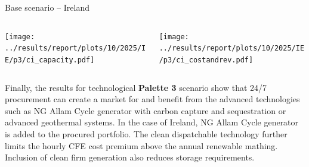 \begin{frame}{Base scenario -- Ireland}

  {\footnotesize

  \begin{columns}
  \begin{column}{7cm}
  \centering
  \texttt{[image: ../results/report/plots/10/2025/IE/p3/ci\_capacity.pdf]}
  \end{column}

  \begin{column}{8cm}
  \centering
  \texttt{[image: ../results/report/plots/10/2025/IE/p3/ci\_costandrev.pdf]}
  \end{column}

  \end{columns}

  \begin{columns}
  \begin{column}{15cm}
  Finally, the results for technological {\bf Palette 3} scenario show that 24/7 procurement
  can create a market for and benefit from the advanced technologies such as 
  NG Allam Cycle generator with carbon capture and sequestration or 
  advanced geothermal systems. 
  In the case of Ireland, NG Allam Cycle generator is added to the 
  procured portfolio. The clean dispatchable technology \alert{further limits 
  the hourly CFE cost premium} above the annual renewable mathing. 
  Inclusion of clean firm generation also reduces storage requirements.
  \end{column}
  \end{columns}
  }

\end{frame}



